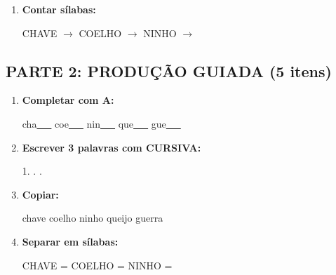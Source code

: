 \begin{exercicio}
\begin{enumerate}
  \item \textbf{Contar sílabas:}
  \begin{center}
  CHAVE $\rightarrow$ \underline{\hspace{0.9cm}} \quad COELHO $\rightarrow$ \underline{\hspace{0.9cm}} \quad NINHO $\rightarrow$ \underline{\hspace{0.9cm}}
  \end{center}

\end{enumerate}

\subsection*{PARTE 2: PRODUÇÃO GUIADA (5 itens)}

\begin{enumerate}[resume]

  \item \textbf{Completar com A:}
  \begin{center}
  cha\underline{~~~} \quad coe\underline{~~~} \quad nin\underline{~~~} \quad que\underline{~~~} \quad gue\underline{~~~}
  \end{center}

  \item \textbf{Escrever 3 palavras com CURSIVA:}
  \begin{center}
  1. \underline{\hspace{3cm}} . \underline{\hspace{3cm}} . \underline{\hspace{3cm}}
  \end{center}

  \item \textbf{Copiar:}
  \begin{center}
  chave \quad coelho \quad ninho \quad queijo \quad guerra
  \end{center}

  \item \textbf{Separar em sílabas:}
  \begin{center}
  CHAVE = \underline{\hspace{1cm}} \underline{\hspace{1cm}} \quad COELHO = \underline{\hspace{1cm}} \underline{\hspace{1cm}} \quad NINHO = \underline{\hspace{1cm}} \underline{\hspace{1cm}}
  \end{center}


\end{enumerate}
\end{exercicio}
